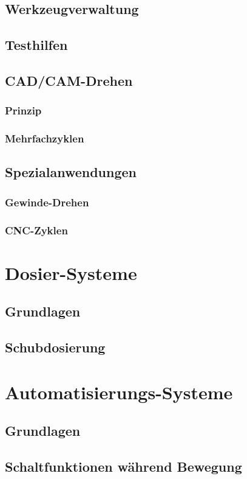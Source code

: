 \documentclass[14pt,a4paper]{book}
\begin{document}
	\section{Werkzeugverwaltung} 
	\section{Testhilfen} 
	\section{CAD/CAM-Drehen} 
		\subsection{Prinzip} 
		\subsection{Mehrfachzyklen} 
	\section{Spezialanwendungen} 
		\subsection{Gewinde-Drehen} 
		\subsection{CNC-Zyklen} 
 
\chapter{Dosier-Systeme}
	\section{Grundlagen} 
	\section{Schubdosierung} 
 
\chapter{Automatisierungs-Systeme}
	\section{Grundlagen} 
	\section{Schaltfunktionen während Bewegung} 
 
\end{document}
